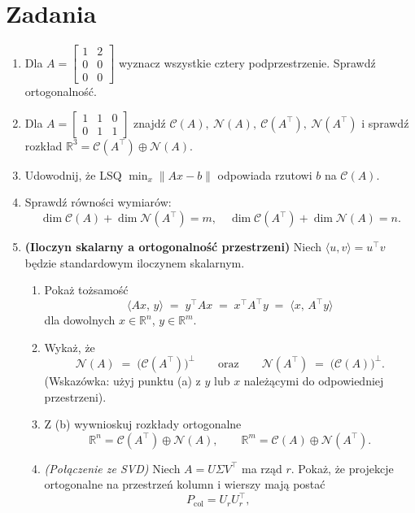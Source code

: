 \documentclass[12pt]{article}
\begin{document}
\section*{Zadania}
\begin{enumerate}[label=\textbf{Z\arabic*}.]
  \item Dla
  \(
  A=\begin{bmatrix}1&2\\0&0\\0&0\end{bmatrix}
  \)
  wyznacz wszystkie cztery podprzestrzenie. Sprawdź ortogonalność.
  \item Dla
  \(
  A=\begin{bmatrix}1&1&0\\0&1&1\end{bmatrix}
  \)
  znajdź $\mathcal{C}(A),\ \mathcal{N}(A),\ \mathcal{C}(A^\top),\ \mathcal{N}(A^\top)$
  i sprawdź rozkład $\mathbb{R}^3=\mathcal{C}(A^\top)\oplus \mathcal{N}(A)$.
  \item Udowodnij, że LSQ $\min_x\|Ax-b\|$ odpowiada rzutowi $b$ na $\mathcal{C}(A)$.
  \item Sprawdź równości wymiarów:
  \[
  \dim \mathcal{C}(A)+\dim \mathcal{N}(A^\top)=m, \quad
  \dim \mathcal{C}(A^\top)+\dim \mathcal{N}(A)=n.
  \]
  \item \textbf{(Iloczyn skalarny a ortogonalność przestrzeni)}  
  Niech $\langle u,v\rangle = u^\top v$ będzie standardowym iloczynem skalarnym.
  \begin{enumerate}[label=(\alph*)]
    \item Pokaż tożsamość
    \[
      \langle Ax,\,y\rangle \;=\; y^\top A x \;=\; x^\top A^\top y \;=\; \langle x,\,A^\top y\rangle
    \]
    dla dowolnych $x\in\mathbb{R}^n$, $y\in\mathbb{R}^m$.
    \item Wykaż, że
    \[
      \mathcal{N}(A) \;=\; \big(\mathcal{C}(A^\top)\big)^\perp
      \qquad\text{oraz}\qquad
      \mathcal{N}(A^\top) \;=\; \big(\mathcal{C}(A)\big)^\perp.
    \]
    (Wskazówka: użyj punktu (a) z $y$ lub $x$ należącymi do odpowiedniej przestrzeni).
    \item Z (b) wywnioskuj rozkłady ortogonalne
    \[
      \mathbb{R}^n = \mathcal{C}(A^\top)\oplus \mathcal{N}(A),
      \qquad
      \mathbb{R}^m = \mathcal{C}(A)\oplus \mathcal{N}(A^\top).
    \]
    \item \emph{(Połączenie ze SVD)} Niech $A=U\Sigma V^\top$ ma rząd $r$.
    Pokaż, że projekcje ortogonalne na przestrzeń kolumn i wierszy mają postać
    \[
      P_{\mathrm{col}} = U_r U_r^\top,\qquad
\]
\end{enumerate}
\end{enumerate}
\end{document}
